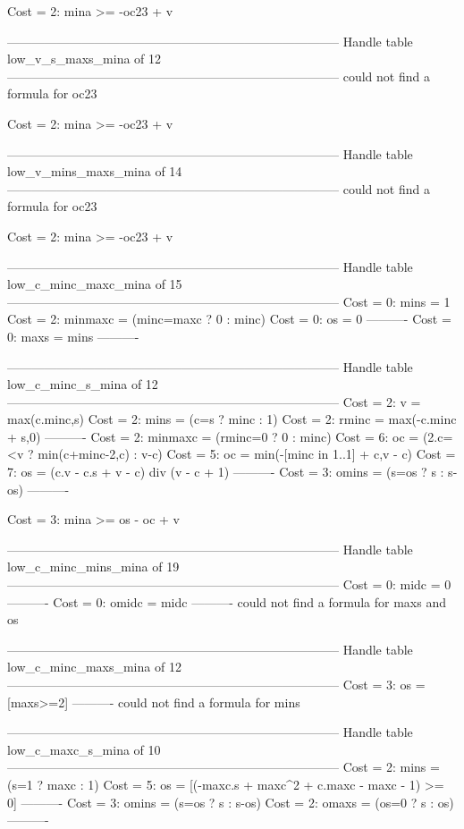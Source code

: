 Cost =  2:  mina >= -oc23 + v

--------------------------------------------------------------------------------
Handle table low_v_s_maxs_mina of 12
--------------------------------------------------------------------------------
could not find a formula for oc23

Cost =  2:  mina >= -oc23 + v

--------------------------------------------------------------------------------
Handle table low_v_mins_maxs_mina of 14
--------------------------------------------------------------------------------
could not find a formula for oc23

Cost =  2:  mina >= -oc23 + v

--------------------------------------------------------------------------------
Handle table low_c_minc_maxc_mina of 15
--------------------------------------------------------------------------------
Cost =  0:  mins    = 1
Cost =  2:  minmaxc = (minc=maxc ? 0 : minc)
Cost =  0:  os      = 0
----------
Cost =  0:  maxs    = mins
----------


--------------------------------------------------------------------------------
Handle table low_c_minc_s_mina of 12
--------------------------------------------------------------------------------
Cost =  2:  v       = max(c.minc,s)
Cost =  2:  mins    = (c=s ? minc : 1)
Cost =  2:  rminc   = max(-c.minc + s,0)
----------
Cost =  2:  minmaxc = (rminc=0 ? 0 : minc)
Cost =  6:  oc      = (2.c=<v ? min(c+minc-2,c) : v-c)
Cost =  5:  oc      = min(-[minc in 1..1] + c,v - c)
Cost =  7:  os      = (c.v - c.s + v - c) div (v - c + 1)
----------
Cost =  3:  omins   = (s=os ? s : s-os)
----------

Cost =  3:  mina >= os - oc + v

--------------------------------------------------------------------------------
Handle table low_c_minc_mins_mina of 19
--------------------------------------------------------------------------------
Cost =  0:  midc  = 0
----------
Cost =  0:  omidc = midc
----------
could not find a formula for maxs and os


--------------------------------------------------------------------------------
Handle table low_c_minc_maxs_mina of 12
--------------------------------------------------------------------------------
Cost =  3:  os   = [maxs>=2]
----------
could not find a formula for mins


--------------------------------------------------------------------------------
Handle table low_c_maxc_s_mina of 10
--------------------------------------------------------------------------------
Cost =  2:  mins  = (s=1 ? maxc : 1)
Cost =  5:  os    = [(-maxc.s + maxc^2 + c.maxc - maxc - 1) >= 0]
----------
Cost =  3:  omins = (s=os ? s : s-os)
Cost =  2:  omaxs = (os=0 ? s : os)
----------


